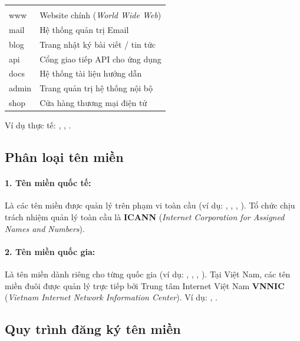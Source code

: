 \begin{prettyTableBox}
\begin{tabularx}{\linewidth}{K{3cm} Z}
 &  \\
www & Website chính (\textit{World Wide Web}) \\
mail & Hệ thống quản trị Email \\
blog & Trang nhật ký bài viết / tin tức \\
api & Cổng giao tiếp API cho ứng dụng \\
docs & Hệ thống tài liệu hướng dẫn \\
admin & Trang quản trị hệ thống nội bộ \\
shop & Cửa hàng thương mại điện tử \\
\end{tabularx}
\end{prettyTableBox}

Ví dụ thực tế: , , .

\subsection{Phân loại tên miền}

\paragraph{1. Tên miền quốc tế:} Là các tên miền được quản lý trên phạm vi toàn cầu (ví dụ: , , , ). Tổ chức chịu trách nhiệm quản lý toàn cầu là \textbf{ICANN} (\textit{Internet Corporation for Assigned Names and Numbers}).

\paragraph{2. Tên miền quốc gia:} Là tên miền dành riêng cho từng quốc gia (ví dụ: , , , ). Tại Việt Nam, các tên miền đuôi  được quản lý trực tiếp bởi Trung tâm Internet Việt Nam \textbf{VNNIC} (\textit{Vietnam Internet Network Information Center}). Ví dụ: , .

\subsection{Quy trình đăng ký tên miền}

